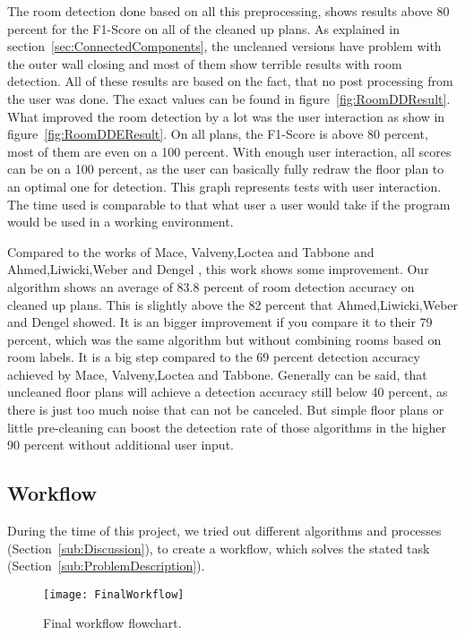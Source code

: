 The room detection done based on all this preprocessing, shows results above 80 percent for the F1-Score on all of the cleaned up plans. As explained in section~\ref{sec:ConnectedComponents}, the uncleaned versions have problem with the outer wall closing and most of them show terrible results with room detection. All of these results are based on the fact, that no post processing from the user was done. The exact values can be found in figure~\ref{fig:RoomDDResult}. What improved the room detection by a lot was the user interaction as show in figure~\ref{fig:RoomDDEResult}. On all plans, the F1-Score is above 80 percent, most of them are even on a 100 percent. With enough user interaction, all scores can be on a 100 percent, as the user can basically fully redraw the floor plan to an optimal one for detection. This graph represents tests with user interaction. The time used is comparable to that what user a user would take if the program would be used in a working environment.

Compared to the works of Mace, Valveny,Loctea and Tabbone \citep{mace_valveny_loctea_tabbone_2010} and Ahmed,Liwicki,Weber and Dengel \citep{ahmed_liwicki_weber_dengel_2012}, this work shows some improvement. Our algorithm shows an average of 83.8 percent of room detection accuracy on cleaned up plans. This is slightly above the 82 percent that Ahmed,Liwicki,Weber and Dengel showed. It is an bigger improvement if you compare it to their 79 percent, which was the same algorithm but without combining rooms based on room labels. It is a big step compared to the 69 percent detection accuracy achieved by Mace, Valveny,Loctea and Tabbone. Generally can be said, that uncleaned floor plans will achieve a detection accuracy still below 40 percent, as there is just too much noise that can not be canceled. But simple floor plans or little pre-cleaning can boost the detection rate of those algorithms in the higher 90 percent without additional user input. 



\subsection{Workflow}
During the time of this project, we tried out different algorithms and processes (Section~\ref{sub:Discussion}), to create a workflow, which solves the stated task (Section~\ref{sub:ProblemDescription}).

\begin{figure}[H]
	\centering
	\texttt{[image: FinalWorkflow]}
	\caption{Final workflow flowchart.}
	\label{fig:FinalWorkflow}
\end{figure}

